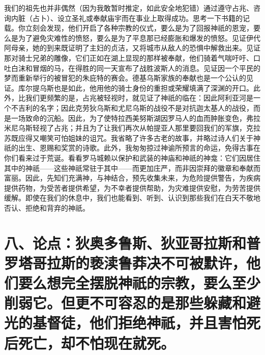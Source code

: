 我们的祖先也并非偶然（因为我敢暂时推定，如此安全地犯错）通过遵守占兆、咨询内脏（占卜）、设立圣礼或奉献庙宇而在事业上取得成功。思考一下书籍的记载。你立刻会发现，他们开启了各种宗教的仪式，要么是为了回报神祇的恩宠，要么是为了避免灾难性的愤怒，要么是为了平息那已经膨胀和爆发的愤怒。见证伊代阿母亲，她的到来既证明了主妇的贞洁，又将城市从敌人的恐惧中解救出来。见证那对骑士兄弟的雕像，它们正如在湖上显现的那样被奉献，他们骑着气喘吁吁、口吐白沫和冒烟的马，在得胜的同一天宣布了战胜波斯人的消息。见证因一个平民的梦而重新举行的被冒犯的朱庇特的赛会。德基乌斯家族的奉献也是一个公认的见证。库尔提乌斯也是如此，他用他的骑士身份的重担或荣耀填满了深渊的开口。此外，比我们更频繁的是，占兆被轻视时，就见证了神祇的临在：因此阿利亚河是一个不吉利的名字；因此克劳狄乌斯和尤尼乌斯的战役不是对抗迦太基人的战役，而是一场致命的沉船。因此，为了使特拉西美努斯湖因罗马人的血而肿胀变色，弗拉米尼乌斯轻视了占兆；并且为了让我们再次从帕提亚人那里要回我们的军旗，克拉苏既应得又嘲笑可怕姐妹的诅咒。我省略了许多古老的故事，并略过诗人们关于神祇的出生、恩赐和奖赏的诗歌。此外，我匆匆掠过神谕所预言的命运，免得古事在你们看来过于荒诞。看看罗马城赖以保护和武装的神庙和神祇的神龛：它们因居住其中的神祇——这些神祇常驻于其中——而更加庄严，而非因崇拜的徽章和奉献而富丽。因此，先知们充满神，与神结合，预先收集未来，为危险提供警告，为疾病提供药物，为受苦者提供希望，为不幸者提供帮助，为灾难提供安慰，为劳苦提供缓解。即使在我们的休息中，我们也能看到、听到、认识到那些我们在白天不敬地否认、拒绝和背弃的神祇。\par


\section{八、论点：狄奥多鲁斯、狄亚哥拉斯和普罗塔哥拉斯的亵渎鲁莽决不可被默许，他们要么想完全摆脱神祇的宗教，要么至少削弱它。但更不可容忍的是那些躲藏和避光的基督徒，他们拒绝神祇，并且害怕死后死亡，却不怕现在就死。}

